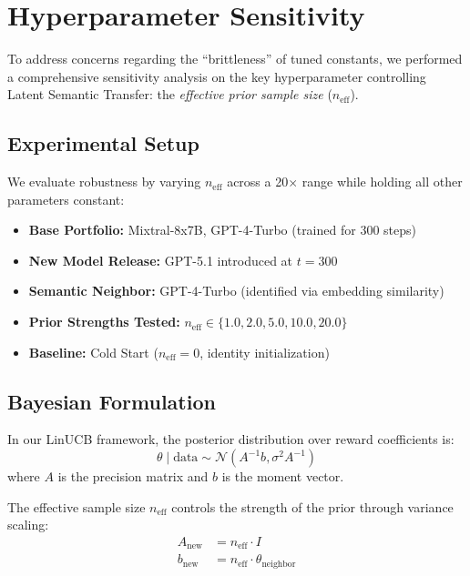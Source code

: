 
\section{Hyperparameter Sensitivity}
\label{appendix:hyperparameter_sensitivity}

To address concerns regarding the ``brittleness'' of tuned constants, we performed 
a comprehensive sensitivity analysis on the key hyperparameter controlling Latent 
Semantic Transfer: the \emph{effective prior sample size} ($n_{\text{eff}}$).

\subsection{Experimental Setup}

We evaluate robustness by varying $n_{\text{eff}}$ across a 20$\times$ range while 
holding all other parameters constant:

\begin{itemize}[leftmargin=*,noitemsep]
    \item \textbf{Base Portfolio:} Mixtral-8x7B, GPT-4-Turbo (trained for 300 steps)
    \item \textbf{New Model Release:} GPT-5.1 introduced at $t=300$
    \item \textbf{Semantic Neighbor:} GPT-4-Turbo (identified via embedding similarity)
    \item \textbf{Prior Strengths Tested:} $n_{\text{eff}} \in \{1.0, 2.0, 5.0, 10.0, 20.0\}$
    \item \textbf{Baseline:} Cold Start ($n_{\text{eff}}=0$, identity initialization)
\end{itemize}

\subsection{Bayesian Formulation}

In our LinUCB framework, the posterior distribution over reward coefficients is:
\begin{equation}
\theta \mid \text{data} \sim \mathcal{N}(A^{-1}b, \sigma^2 A^{-1})
\end{equation}
where $A$ is the precision matrix and $b$ is the moment vector.

The effective sample size $n_{\text{eff}}$ controls the strength of the prior 
through variance scaling:
\begin{align}
A_{\text{new}} &= n_{\text{eff}} \cdot I \label{eq:prior_precision} \\
b_{\text{new}} &= n_{\text{eff}} \cdot \theta_{\text{neighbor}} \label{eq:prior_moment}
\end{align}


